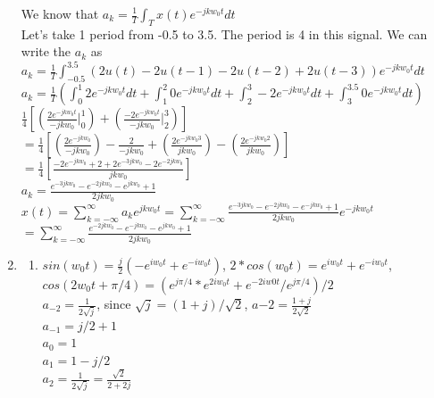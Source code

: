 \documentclass[10pt,a4paper, margin=1in]{article}
\begin{document}
\begin{enumerate}
We know that $a_k = \frac{1}{T}\int_Tx(t)e^{-jkw_0t}dt$ \\

Let's take 1 period from -0.5 to 3.5. The period is 4 in this signal. We can write the $a_k$ as \\

$a_k = \frac{1}{T}\int_{-0.5}^{3.5}(2u(t) - 2u(t-1) - 2u(t-2) + 2u(t-3))e^{-jkw_0t}dt$ \\

$a_k = \frac{1}{T}(\int_{0}^{1}2e^{-jkw_0t}dt + \int_{1}^{2}0e^{-jkw_0t}dt + \int_{2}^{3}-2e^{-jkw_0t}dt + \int_{3}^{3.5}0e^{-jkw_0t}dt)$ \\

$\frac{1}{4} [(\frac{2e^{-jkw_0t}}{-jkw_0}|^1_0) + (\frac{-2e^{-jkw_0t}}{-jkw_0}|^3_2)]$ \\

$= \frac{1}{4} [(\frac{2e^{-jkw_0}}{-jkw_0}) - \frac{2}{-jkw_0} + (\frac{2e^{-jkw_0 3}}{jkw_0}) - (\frac{2e^{-jkw_0 2}}{jkw_0})]$ \\

$= \frac{1}{4} [\frac{-2e^{-jkw_0} + 2 + 2e^{-3jkw_0} - 2e^{-2jkw_0}}{jkw_0}]$ \\

$a_k = \frac{e^{-3jkw_0} - e^{-2jkw_0} -e^{jkw_0} + 1}{2jkw_0}$ \\

$x(t) = \sum_{k=-\infty}^{\infty}a_ke^{jkw_0t} = \sum_{k=-\infty}^{\infty}\frac{e^{-3jkw_0} - e^{-2jkw_0} -e^{-jkw_0} + 1}{2jkw_0}e^{-jkw_0t}$ \\

$= \sum_{k=-\infty}^{\infty}\frac{e^{-2jkw_0} - e^{-jkw_0} -e^{jkw_0} + 1}{2jkw_0}$

\item %
    \begin{enumerate}   
    \item $sin(w_0t) = \frac{j}{2}(-e^{iw_0t} + e^{-iw_0t})$, $2*cos(w_0t) = e^{iw_0t} + e^{-iw_0t}$, $cos(2w_0t + \pi/4) = (e^{j\pi/4}*e^{2iw_0t} + e^{-2iw0t}/e^{j\pi/4})/2$ \\
    $a_{-2} = \frac{1}{2\sqrt{j}}$, since $\sqrt{j} = (1+j)/\sqrt{2}$, $a{-2} = \frac{1+j}{2\sqrt{2}}$\\
    $a_{-1} = j/2+1$\\
    $a_0 = 1$\\
    $a_1 = 1-j/2$\\
    $a_2 = \frac{1}{2\sqrt{j}} = \frac{\sqrt{2}}{2+2j}$\\


\end{enumerate}
\end{enumerate}
\end{document}
